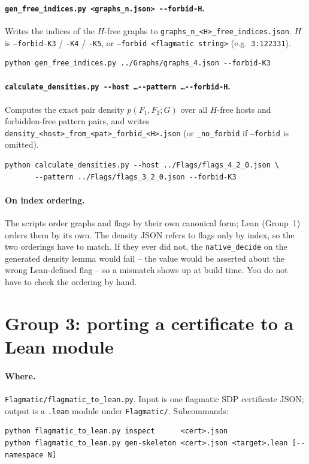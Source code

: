 \documentclass[11pt]{article}
\begin{document}
\paragraph{\texttt{gen\_free\_indices.py <graphs\_n.json> {-}{-}forbid-H}.}
Writes the indices of the $H$-free graphs to
\texttt{graphs\_n\_<H>\_free\_indices.json}. $H$ is \texttt{--forbid-K3} /
\texttt{-K4} / \texttt{-K5}, or \texttt{--forbid <flagmatic string>}
(e.g.\ \texttt{3:122331}).
\begin{lstlisting}[language={}]
python gen_free_indices.py ../Graphs/graphs_4.json --forbid-K3
\end{lstlisting}

\paragraph{\texttt{calculate\_densities.py {-}{-}host \ldots {-}{-}pattern \ldots {-}{-}forbid-H}.}
Computes the exact pair density $p(F_1, F_2; G)$ over all $H$-free hosts
and forbidden-free pattern pairs, and writes
\texttt{density\_<host>\_from\_<pat>\_forbid\_<H>.json} (or
\texttt{\_no\_forbid} if \texttt{--forbid} is omitted).
\begin{lstlisting}[language={}]
python calculate_densities.py --host ../Flags/flags_4_2_0.json \
       --pattern ../Flags/flags_3_2_0.json --forbid-K3
\end{lstlisting}

\paragraph{On index ordering.} The scripts order graphs and flags by their
own canonical form; Lean (Group~1) orders them by its own. The density
JSON refers to flags only by index, so the two orderings have to match. If
they ever did not, the \texttt{native\_decide} on the generated density
lemma would fail -- the value would be asserted about the wrong
Lean-defined flag -- so a mismatch shows up at build time. You do not have
to check the ordering by hand.

\section{Group 3: porting a certificate to a Lean module}
\label{sec:cert}

\paragraph{Where.} \texttt{Flagmatic/flagmatic\_to\_lean.py}. Input is one
flagmatic SDP certificate JSON; output is a \texttt{.lean} module under
\texttt{Flagmatic/}. Subcommands:
\begin{lstlisting}[language={}]
python flagmatic_to_lean.py inspect      <cert>.json
python flagmatic_to_lean.py gen-skeleton <cert>.json <target>.lean [--namespace N]
\end{lstlisting}
\end{document}
